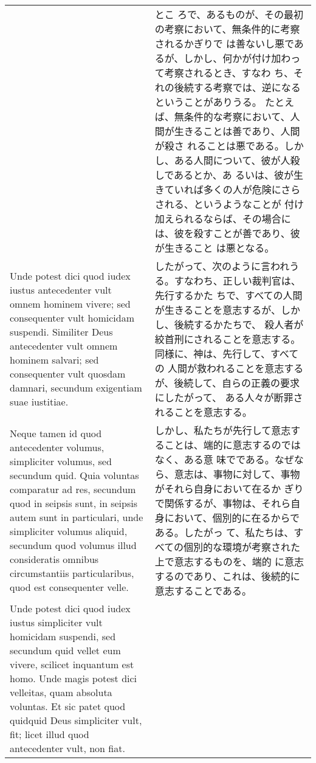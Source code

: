 \documentclass[10pt]{jsarticle} %
\begin{document}
\begin{longtable}{p{21em}p{21em}}
&

とこ
 ろで、あるものが、その最初の考察において、無条件的に考察されるかぎりで
 は善ないし悪であるが、しかし、何かが付け加わって考察されるとき、すなわ
 ち、それの後続する考察では、逆になるということがありうる。
たとえば、無条件的な考察において、人間が生きることは善であり、人間が殺さ
 れることは悪である。しかし、ある人間について、彼が人殺しであるとか、あ
 るいは、彼が生きていれば多くの人が危険にさらされる、というようなことが
 付け加えられるならば、その場合には、彼を殺すことが善であり、彼が生きること
 は悪となる。


\\




Unde potest dici quod iudex iustus
antecedenter vult omnem hominem vivere; sed consequenter vult homicidam
suspendi. Similiter Deus antecedenter vult omnem hominem salvari; sed
consequenter vult quosdam damnari, secundum exigentiam suae
iustitiae. 


&

したがって、次のように言われうる。すなわち、正しい裁判官は、先行するかた
 ちで、すべての人間が生きることを意志するが、しかし、後続するかたちで、
 殺人者が絞首刑にされることを意志する。同様に、神は、先行して、すべての
 人間が救われることを意志するが、後続して、自らの正義の要求にしたがって、
 ある人々が断罪されることを意志する。

\\



Neque tamen id quod antecedenter volumus, simpliciter
volumus, sed secundum quid. 
Quia voluntas comparatur ad res, secundum
quod in seipsis sunt, in seipsis autem sunt in particulari, unde
simpliciter volumus aliquid, secundum quod volumus illud consideratis
omnibus circumstantiis particularibus, quod est consequenter velle. 




&


しかし、私たちが先行して意志することは、端的に意志するのではなく、ある意
 味でである。なぜなら、意志は、事物に対して、事物がそれら自身において在るか
 ぎりで関係するが、事物は、それら自身において、個別的に在るからである。したがっ
 て、私たちは、すべての個別的な環境が考察された上で意志するものを、端的
 に意志するのであり、これは、後続的に意志することである。


\\


Unde
potest dici quod iudex iustus simpliciter vult homicidam suspendi, sed
secundum quid vellet eum vivere, scilicet inquantum est homo. Unde magis
potest dici velleitas, quam absoluta voluntas. Et sic patet quod
quidquid Deus simpliciter vult, fit; licet illud quod antecedenter vult,
non fiat.



\end{longtable}
\end{document}
